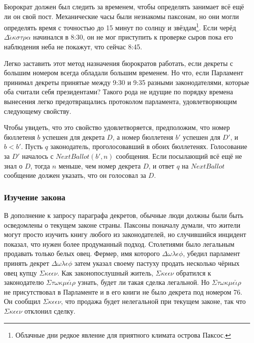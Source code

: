 \documentclass[12pt, a4paper]{article} %
\begin{document}
Бюрократ должен был следить за временем, чтобы определять занимает всё ещё ли он свой пост. Механические часы были незнакомы паксонам, но они могли определять время с точностью до 15 минут по солнцу и звёздам\footnote{Облачные дни редкое явление для приятного климата острова Паксос.}. Если черёд $\Delta\check{\iota}\kappa\sigma\tau\rho\alpha$ начинался в 8:30, он не мог приступить к проверке сыров пока его наблюдения неба не покажут, что сейчас 8:45.

Легко заставить этот метод назначения бюрократов работать, если декреты с большим номером всегда обладали большим временем. Но что, если Парламент принимал декреты
принятые между 9:30 и 9:35 разными законодателями, которые оба считали себя президентами? Такого рода не идущие по порядку времена вынесения легко предотвращались протоколом парламента, удовлетворяющим следующему свойству.


Чтобы увидеть, что это свойство удовлетворяется, предположим, что номер бюллетеня $b$ успешен для декрета $D$, а номер бюллетеня $b'$ успешен для $D'$, и $b < b'$. Пусть $q$ законодатель, проголосовавший в обоих бюллетенях. Голосование за $D'$ началось с $NextBallot(b', n)$ сообщения. Если посылающий всё ещё не знал о $D$, тогда $n$ меньше, чем номер декрета $D$, и ответ $q$ на $NextBallot$ сообщение должен указать, что он голосовал за $D$.

\subsubsection{Изучение закона}\label{sec:learningthelaw}

В дополнение к запросу параграфа декретов, обычные люди должны были быть осведомлены о текущем законе страны. Паксоны поначалу думали, что жители могут просто изучить книгу любого из законодателей, но случившийся инцидент показал, что нужен более продуманный подход. Столетиями было легальным продавать только белых овец. Фермер, имя которого $\Delta\omega\lambda\epsilon\phi$, убедил парламент принять декрет
$\Delta\omega\lambda\epsilon\phi$ затем указал своему пастуху продать несколько чёрных овец купцу $\Sigma\kappa\epsilon\epsilon\nu$. Как законопослушный житель, $\Sigma\kappa\epsilon\epsilon\nu$ обратился к законодателю $\Sigma\tau\omega\kappa\mu\epsilon\check{\iota}\rho$ узнать, будет ли такая сделка легальной. Но $\Sigma\tau\omega\kappa\mu\epsilon\check{\iota}\rho$ не присутствовал в Парламенте и в его книги не было декрета под номером 76. Он сообщил $\Sigma\kappa\epsilon\epsilon\nu$, что продажа будет нелегальной при текущем законе, так что  $\Sigma\kappa\epsilon\epsilon\nu$ отклонил сделку.
\end{document}
